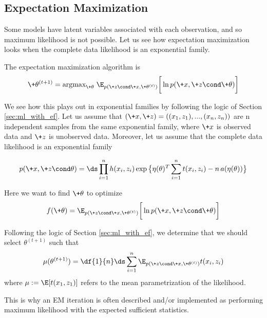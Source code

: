 \documentclass{article} %
\begin{document}
\subsection{Expectation Maximization} \label{sec:em_with_ef}

Some models have latent variables associated with each observation, and so maximum likelihood is not possible.  Let us see how expectation maximization looks when the complete data likelihood is an exponential family.

The expectation maximization algorithm is 
\begin{equation}
\label{eqn:em_algorithm_appendix}
 \+\theta^{(t+1)} =  \text{argmax}_{\+\theta} \; \E_{p(\+z \cond \+x , \+\theta^{(t)})} \bigg[ \ln p(\+x, \+z \cond \+\theta) \bigg] 
 \end{equation}

We see how this plays out in exponential families by following the logic of Section \ref{sec:ml_with_ef}.   Let us assume that $(\+x, \+z)=((x_1,z_1), ..., (x_n, z_n))$ are n independent samples from the same exponential family, where $\+x$ is observed data and $\+z$ is unobserved data.
Moreover, let us assume that the complete data likelihood is an exponential family

\begin{align}
\label{eqn:exponential_family_complete_data_likelihood}
 p(\+x, \+z \cond \theta) = \ds\prod_{i=1}^n h(x_i, z_i) \exp \big\{ \eta(\theta)^T \sum_{i=1}^n t(x_i, z_i) - n \,a(\eta(\theta))\big\} 
 \end{align}

Here we want to find $\+\theta$ to optimize 
\[ f(\+\theta) =  \E_{p(\+z \cond \+x , \+\theta^{(t)})} \bigg[ \ln p(\+x, \+z \cond \+\theta) \bigg] \]

Following the logic of Section \ref{sec:ml_with_ef}, we determine that we should select $\theta^{(t+1)}$ such that
\[ \mu(\theta^{(t+1)}) = \df{1}{n} \ds\sum_{i=1}^n   \E_{p(\+z \cond \+x , \+\theta^{(t)})} t(x_i, z_i) \]
where $\mu := \E[t(x_1,z_1)]$ refers to the mean parametrization of the likelihood.

This is why an EM iteration is often described and/or implemented as performing maximum likelihood with the expected sufficient statistics.


 
\end{document}
